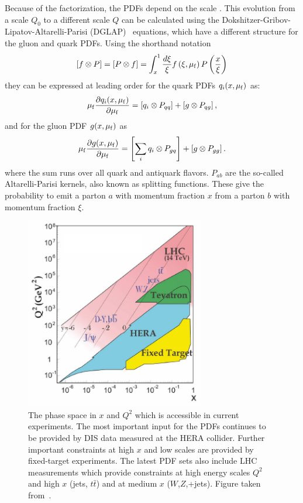 Because of the factorization, the PDFs depend on the scale \muf. This evolution
from a scale $Q_0$ to a different scale $Q$ can be calculated using the
Dokshitzer-Gribov-Lipatov-Altarelli-Parisi
(DGLAP)~\cite{Gribov:1972ri,Altarelli:1977zs,Dokshitzer:1977sg} equations, which
have a different structure for the gluon and quark PDFs. Using the shorthand notation
%
\begin{equation*}
    \left[f \otimes P \right] = \left[ P \otimes f \right] = \int_x^1 \frac{d
    \xi}{\xi} f\left(\xi, \mu_{\mathrm{f}}\right) P\left( \frac{x}{\xi} \right)
\end{equation*}
%
they can be expressed at leading order for the quark PDFs $q_i(x, \mu_{\mathrm{f}})$ as:
\begin{equation*}
    \mu_{\mathrm{f}} \frac{\partial q_i (x, \mu_{\mathrm{f}})}{\partial \mu_{\mathrm{f}}} = \left[ q_i \otimes P_{qq}
    \right] + \left[ g \otimes P_{qg} \right],
\end{equation*}
%
and for the gluon PDF $g(x, \mu_{\mathrm{f}})$ as
%
\begin{equation*}
    \mu_{\mathrm{f}} \frac{\partial g (x, \mu_{\mathrm{f}})}{\partial \mu_{\mathrm{f}}} = \left[\sum_i  q_i \otimes P_{gq}
    \right] + \left[g \otimes P_{gg}\right].
\end{equation*}
%
where the sum runs over all quark and antiquark flavors. $P_{ab}$ are the
so-called Altarelli-Parisi kernels, also known as splitting functions. These
give the probability to emit a parton $a$ with momentum fraction $x$ from a
parton $b$ with momentum fraction $\xi$.


\begin{figure}[htb] 
    \centering
    \includegraphics[width=0.7\textwidth]{figures/theoretical_foundations/phasespace.pdf}\hfill
    \caption[Kinematic phase space region of the experiments]{The phase space
        in $x$ and $Q^2$ which is accessible in current experiments.  The most
        important input for the PDFs continues to be provided by DIS
        data measured at the HERA collider. Further important constraints at
        high $x$ and low scales are provided by fixed-target experiments. The
        latest PDF sets also include LHC measurements which provide constraints
        at high energy scales $Q^2$ and high $x$ (jets, $t\bar t$) and at medium $x$
        ($W$,$Z$,+jets). Figure taken from~\cite{Agashe:2014kda}.} 
    \label{fig:kinematic_phasepace} 
\end{figure}

